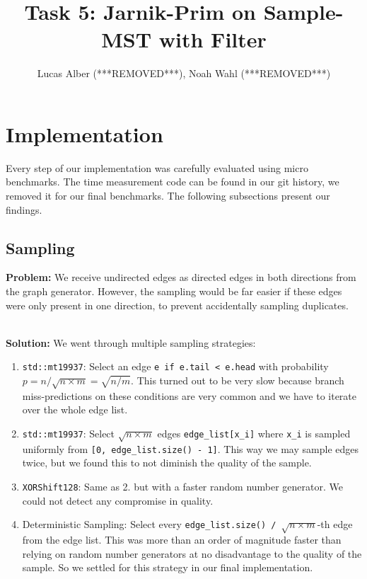 \documentclass{article}
\begin{document}
\title{Task 5: Jarnik-Prim on Sample-MST with Filter}
\author{Lucas Alber (***REMOVED***), Noah Wahl (***REMOVED***)}
\maketitle

\section{Implementation}

Every step of our implementation was carefully evaluated using micro benchmarks.
The time measurement code can be found in our git history, we removed it for our final benchmarks.
The following subsections present our findings.

\subsection{Sampling}
\textbf{Problem:} We receive undirected edges as directed edges in both directions from the graph generator.
However, the sampling would be far easier if these edges were only present in one direction, to prevent accidentally sampling duplicates.

\noindent \\
\textbf{Solution:} We went through multiple sampling strategies:

\begin{enumerate}
\item \texttt{std::mt19937}: Select an edge \texttt{e if e.tail < e.head} with probability $p = n / \sqrt{n \times m} = \sqrt{n / m}$.
This turned out to be very slow because branch miss-predictions on these conditions are very common and we have to iterate over the whole edge list.

\item \texttt{std::mt19937}: Select $\sqrt{n \times m}$ edges \texttt{edge\_list[x\_i]} where \texttt{x\_i} is sampled uniformly from \texttt{[0, edge\_list.size() - 1]}.
This way we may sample edges twice, but we found this to not diminish the quality of the sample.

\item \texttt{XORShift128}: Same as 2. but with a faster random number generator.
We could not detect any compromise in quality.

\item Deterministic Sampling: Select every \texttt{edge\_list.size() / $\sqrt{n \times m}$}-th edge from the edge list.
This was more than an order of magnitude faster than relying on random number generators at no disadvantage to the quality of the sample.
So we settled for this strategy in our final implementation.
\end{enumerate}
\end{document}
